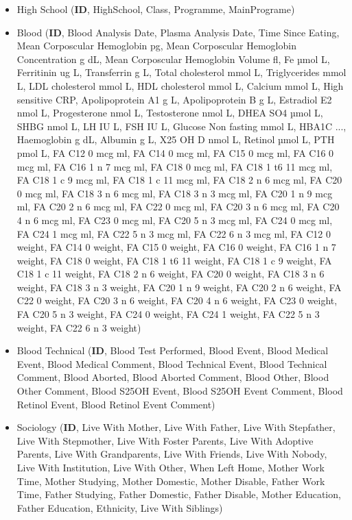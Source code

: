 \begin{sloppypar}
\begin{itemize}
    \item {High School} (\textbf{ID}, HighSchool, Class, Programme, MainPrograme)
    
    \item {Blood} (\textbf{ID}, Blood Analysis Date, Plasma Analysis Date, Time Since Eating, Mean Corposcular Hemoglobin pg, Mean Corposcular Hemoglobin Concentration g dL, Mean Corposcular Hemoglobin Volume fl, Fe µmol L, Ferritinin ug L, Transferrin g L, Total cholesterol mmol L, Triglycerides mmol L, LDL cholesterol mmol L, HDL cholesterol mmol L, Calcium mmol L, High sensitive CRP, Apolipoprotein A1 g L, Apolipoprotein B g L, Estradiol E2 nmol L, Progesterone nmol L, Testosterone nmol L, DHEA SO4 µmol L, SHBG nmol L, LH IU L, FSH IU L, Glucose Non fasting mmol L, HBA1C ..., Haemoglobin g dL, Albumin g L, X25 OH D nmol L, Retinol µmol L, PTH pmol L, FA C12 0 mcg ml, FA C14 0 mcg ml, FA C15 0 mcg ml, FA C16 0 mcg ml, FA C16 1 n 7 mcg ml, FA C18 0 mcg ml, FA C18 1 t6 11 mcg ml, FA C18 1 c 9 mcg ml, FA C18 1 c 11 mcg ml, FA C18 2 n 6 mcg ml, FA C20 0 mcg ml, FA C18 3 n 6 mcg ml, FA C18 3 n 3 mcg ml, FA C20 1 n 9 mcg ml, FA C20 2 n 6 mcg ml, FA C22 0 mcg ml, FA C20 3 n 6 mcg ml, FA C20 4 n 6 mcg ml, FA C23 0 mcg ml, FA C20 5 n 3 mcg ml, FA C24 0 mcg ml, FA C24 1 mcg ml, FA C22 5 n 3 mcg ml, FA C22 6 n 3 mcg ml, FA C12 0 weight, FA C14 0 weight, FA C15 0 weight, FA C16 0 weight, FA C16 1 n 7 weight, FA C18 0 weight, FA C18 1 t6 11 weight, FA C18 1 c 9 weight, FA C18 1 c 11 weight, FA C18 2 n 6 weight, FA C20 0 weight, FA C18 3 n 6 weight, FA C18 3 n 3 weight, FA C20 1 n 9 weight, FA C20 2 n 6 weight, FA C22 0 weight, FA C20 3 n 6 weight, FA C20 4 n 6 weight, FA C23 0 weight, FA C20 5 n 3 weight, FA C24 0 weight, FA C24 1 weight, FA C22 5 n 3 weight, FA C22 6 n 3 weight)
    
    \item {Blood Technical} (\textbf{ID}, Blood Test Performed, Blood Event, Blood Medical Event, Blood Medical Comment, Blood Technical Event, Blood Technical Comment, Blood Aborted, Blood Aborted Comment, Blood Other, Blood Other Comment, Blood S25OH Event, Blood S25OH Event Comment, Blood Retinol Event, Blood Retinol Event Comment)

    \item {Sociology} (\textbf{ID}, Live With Mother, Live With Father, Live With Stepfather, Live With Stepmother, Live With Foster Parents, Live With Adoptive Parents, Live With Grandparents, Live With Friends, Live With Nobody, Live With Institution, Live With Other, When Left Home, Mother Work Time, Mother Studying, Mother Domestic, Mother Disable, Father Work Time, Father Studying, Father Domestic, Father Disable, Mother Education, Father Education, Ethnicity, Live With Siblings)
    

\end{itemize}
\end{sloppypar}

